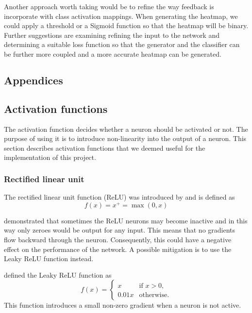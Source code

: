 \documentclass{l4proj}
\begin{document}
Another approach worth taking would be to refine the way feedback is incorporate with class activation mappings. When generating the heatmap, we could apply a threshold or a Sigmoid function so that the heatmap will be binary. Further suggestions are  examining refining the input to the network and determining a suitable loss function so that the generator and the classifier can be further more coupled and a more accurate heatmap can be generated.

%
% 

\begin{appendices}

\chapter{Appendices}

\section{Activation functions}
\label{activation}
The activation function decides whether a neuron should be activated or not. The purpose of using it is to introduce non-linearity into the output of a neuron. This section describes activation functions that we deemed useful for the implementation of this project.

\subsection{Rectified linear unit}
The rectified linear unit function (ReLU) was introduced by \cite{relu} and is defined as
\begin{equation}
    f(x)=x^{+}=\max(0,x)
\end{equation}

\cite{dyingrelu} demonstrated that sometimes the ReLU neurons may become inactive and in this way only zeroes would be output for any input. This means that no gradients flow backward through the neuron. Consequently, this could have a negative effect on the performance of the network. A possible mitigation is to use the Leaky ReLU function instead.

\cite{leakyrelu} defined the Leaky ReLU function as
\begin{equation}
    f(x)={\begin{cases}x&{\text{if }}x>0,\\0.01x&{\text{otherwise}}.\end{cases}}
\end{equation}
This function introduces a small non-zero gradient when a neuron is not active.


\end{appendices}
\end{document}
